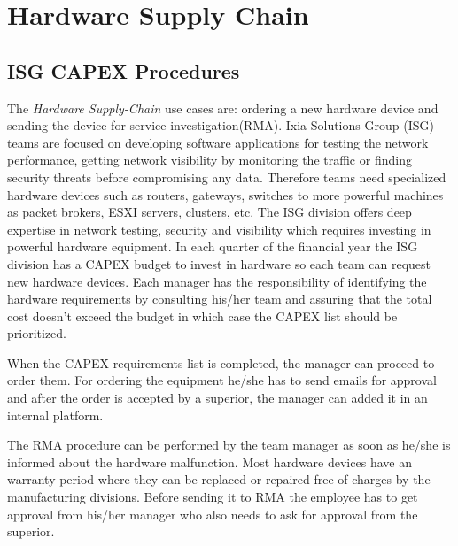 \chapter{Hardware Supply Chain}
\label{chapter:chapter4}

\section{ISG CAPEX Procedures}
\label{sub-sec:chapter4-section1}
The \emph{Hardware Supply-Chain} use cases are: ordering a new hardware device and sending the device for service investigation(RMA).
Ixia Solutions Group (ISG) teams are focused on developing software applications for testing the network performance, getting network visibility by monitoring the traffic or finding security threats before compromising any data.
Therefore teams need specialized hardware devices such as routers, gateways, switches to more powerful machines as packet brokers, ESXI servers, clusters, etc.
The ISG division offers deep expertise in network testing, security and visibility which requires investing in powerful hardware equipment.
In each quarter of the financial year the ISG division has a CAPEX budget to invest in hardware so each team can request new hardware devices.
Each manager has the responsibility of identifying the hardware requirements by consulting his/her team and assuring that the total cost doesn't exceed the budget in which case the CAPEX list should be prioritized.

When the CAPEX requirements list is completed, the manager can proceed to order them.
For ordering the equipment he/she has to send emails for approval and after the order is accepted by a superior, the manager can added it in an internal platform.

The RMA procedure can be performed by the team manager as soon as he/she is informed about the hardware malfunction. Most hardware devices have an warranty period where they can be replaced or repaired free of charges by the manufacturing divisions. Before sending it to RMA the employee has to get approval from his/her manager who also needs to ask for approval from the superior.

